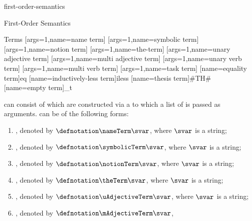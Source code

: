 \documentclass{stex}
\begin{document}
\begin{smodule}{first-order-semantics}
\begin{sfragment}[id=sec:first-order-semantics]{First-Order Semantics}
  \begin{sfragment}[id=sec:terms]{Terms}
    [args=1,name=name term]{}
    [args=1,name=symbolic term]{}
    [args=1,name=notion term]{}
    [args=1,name=the-term]{}
    [args=1,name=unary adjective term]{}
    [args=1,name=multi adjective term]{}
    [args=1,name=unary verb term]{}
    [args=1,name=multi verb term]{}
    [args=1,name=task term]{}
    [name=equality term]{\textsf{eq}}
    [name=inductively-less term]{\textsf{iless}}
    [name=thesis term]{\textsf{\#TH\#}}
    [name=empty term]{\epsilon_{\textsf{t}}}
    \begin{sparagraph}[style=symdoc,for={term name,nameTerm,symbolicTerm,theTerm,uAdjectiveTerm,mAdjectiveTerm,
    uVerbTerm,mVerbTerm,taskTerm,equalityTerm,ilessTerm,thesisTerm,emptyTerm}]
       can consist of  which are constructed via a  to
      which a list of  is passed as arguments.
       can be of the following forms:
      \begin{enumerate}
        \item {}, denoted by $\defnotation\nameTerm\svar$,
          where $\svar$ is a string;
        \item {}, denoted by $\defnotation\symbolicTerm\svar$,
          where $\svar$ is a string;
        \item {}, denoted by $\defnotation\notionTerm\svar$,
          where $\svar$ is a string;
        \item {}, denoted by $\defnotation\theTerm\svar$,
          where $\svar$ is a string;
        \item {}, denoted by $\defnotation\uAdjectiveTerm\svar$,
          where $\svar$ is a string;
        \item {}, denoted by $\defnotation\mAdjectiveTerm\svar$,

\end{enumerate}
\end{sparagraph}
\end{sfragment}
\end{sfragment}
\end{smodule}
\end{document}
